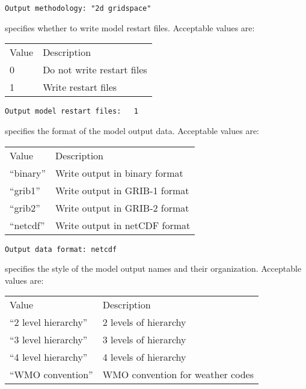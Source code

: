  \begin{Verbatim}[frame=single]
Output methodology: "2d gridspace"
 \end{Verbatim}

 
  specifies whether to write
 model restart files.
 Acceptable values are:

 \begin{tabular}{ll}
 Value & Description                \\
 0     & Do not write restart files \\
 1     & Write restart files        \\
 \end{tabular}
 

 \begin{Verbatim}[frame=single]
Output model restart files:   1
 \end{Verbatim}

 
  specifies the format of the model output data.
 Acceptable values are:

 \begin{tabular}{ll}
 Value      & Description                       \\
 ``binary'' & Write output in binary format     \\
 ``grib1''  & Write output in GRIB-1 format     \\
 
 ``grib2''  & Write output in GRIB-2 format     \\
 
 ``netcdf'' & Write output in netCDF format     \\
 \end{tabular}
 

 \begin{Verbatim}[frame=single]
Output data format: netcdf
 \end{Verbatim}

 
  specifies the style of the model output
 names and their organization.
 Acceptable values are:

 \begin{tabular}{ll}
 Value                 & Description                       \\
 ``2 level hierarchy'' & 2 levels of hierarchy             \\
 ``3 level hierarchy'' & 3 levels of hierarchy             \\
 ``4 level hierarchy'' & 4 levels of hierarchy             \\
 ``WMO convention''    & WMO convention for weather codes  \\
 \end{tabular}
 

